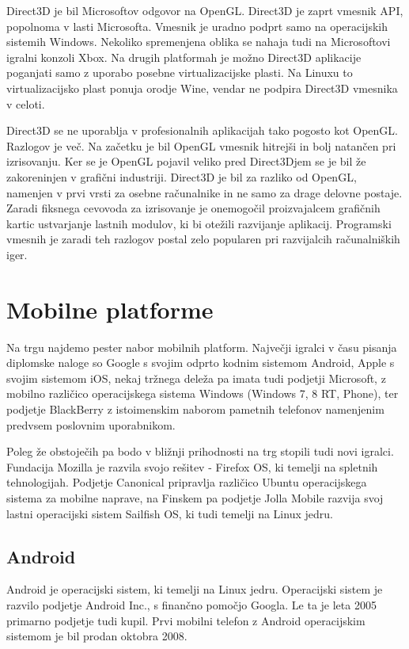 Direct3D \cite{direct3d} je bil Microsoftov odgovor na OpenGL. Direct3D je zaprt vmesnik API, popolnoma v lasti Microsofta. Vmesnik je uradno podprt samo na operacijskih sistemih Windows. Nekoliko spremenjena oblika se nahaja tudi na Microsoftovi igralni konzoli Xbox. Na drugih platformah je možno Direct3D aplikacije poganjati samo z uporabo posebne virtualizacijske plasti. Na Linuxu to virtualizacijsko plast ponuja orodje Wine, vendar ne podpira Direct3D vmesnika v celoti.

Direct3D se ne uporablja v profesionalnih aplikacijah tako pogosto kot OpenGL. Razlogov je več. Na začetku je bil OpenGL vmesnik hitrejši in bolj natančen pri izrisovanju. Ker se je OpenGL pojavil veliko pred Direct3Djem se je bil že zakoreninjen v grafični industriji. Direct3D je bil za razliko od OpenGL, namenjen v prvi vrsti za osebne računalnike in ne samo za drage delovne postaje. Zaradi fiksnega cevovoda za izrisovanje je onemogočil proizvajalcem grafičnih kartic ustvarjanje lastnih modulov, ki bi otežili razvijanje aplikacij. Programski vmesnih je zaradi teh razlogov postal zelo popularen pri razvijalcih računalniških iger.

\section{Mobilne platforme} 

Na trgu najdemo pester nabor mobilnih platform. Največji igralci v času pisanja diplomske naloge so Google s svojim odprto kodnim sistemom Android, Apple s svojim sistemom iOS, nekaj tržnega deleža pa imata tudi podjetji Microsoft, z mobilno različico operacijskega sistema Windows (Windows 7, 8 RT, Phone), ter podjetje BlackBerry z istoimenskim naborom pametnih telefonov namenjenim predvsem poslovnim uporabnikom.

Poleg že obstoječih pa bodo v bližnji prihodnosti na trg stopili tudi novi igralci. Fundacija Mozilla je  razvila svojo rešitev - Firefox OS, ki temelji na spletnih tehnologijah. Podjetje Canonical pripravlja različico Ubuntu operacijskega sistema za  mobilne naprave, na Finskem pa podjetje Jolla Mobile razvija svoj lastni operacijski sistem Sailfish OS, ki tudi temelji na Linux jedru.

\subsection{Android}

Android \cite{andriod} je operacijski sistem, ki temelji na Linux jedru. Operacijski sistem je razvilo podjetje Android Inc., s finančno pomočjo Googla. Le ta je leta 2005 primarno podjetje tudi kupil. Prvi mobilni telefon z Android operacijskim sistemom je bil prodan oktobra 2008.

